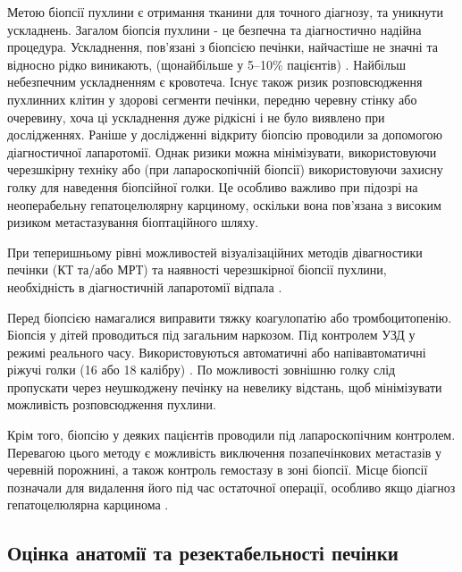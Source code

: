 Метою біопсії пухлини є отримання тканини для точного діагнозу, та уникнути ускладнень. Загалом біопсія пухлини - це безпечна та діагностично надійна процедура. Ускладнення, пов’язані з біопсією печінки, найчастіше не значні та відносно рідко виникають, (щонайбільше у 5–10\% пацієнтів) \cite{pmid27730288}. Найбільш небезпечним ускладненням є кровотеча. Існує також ризик розповсюдження пухлинних клітин у здорові сегменти печінки, передню черевну стінку або очеревину, хоча ці ускладнення дуже рідкісні і не було виявлено при дослідженнях\cite{pmid27781375}. Раніше у дослідженні відкриту біопсію проводили за допомогою діагностичної лапаротомії. Однак ризики можна мінімізувати, використовуючи черезшкірну техніку або (при лапароскопічній біопсії) використовуючи захисну голку для наведення біопсійної голки. Це особливо важливо при підозрі на неоперабельну гепатоцелюлярну карциному, оскільки вона пов'язана з високим ризиком метастазування біоптаційного шляху. 

При теперишньому рівні можливостей візуалізаційних методів дівагностики печінки (КТ та/або МРТ) та наявності черезшкірної біопсії пухлини, необхідність в діагностичній лапаротомії відпала \cite{pmid28126357}. 

Перед біопсією намагалися виправити тяжку коагулопатію або тромбоцитопенію. Біопсія у дітей проводиться під загальним наркозом. Під контролем УЗД у режимі реального часу. Використовуються автоматичні або напівавтоматичні ріжучі голки (16 або 18 калібру) \cite{pmid28138611}. По можливості зовнішню голку слід пропускати через неушкоджену печінку на невелику відстань, щоб мінімізувати можливість розповсюдження пухлини. 

Крім того, біопсію у деяких пацієнтів проводили під лапароскопічним контролем. Перевагою цього методу є можливість виключення позапечінкових метастазів у черевній порожнині, а також контроль гемостазу в зоні біопсії. Місце біопсії позначали для видалення його під час остаточної операції, особливо якщо діагноз гепатоцелюлярна карцинома \cite{pmid28211941}. 

\subsection{Оцінка анатомії та резектабельності печінки}
